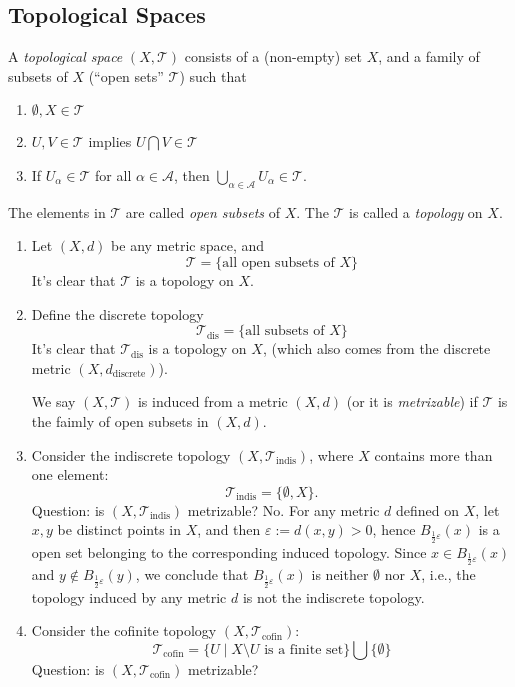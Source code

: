 \subsection{Topological Spaces}
\begin{definition}
A \emph{topological space} $(X,\mathcal{T})$ consists of a (non-empty) set $X$, and a family of subsets of $X$ (``open sets'' $\mathcal{T}$) such that
\begin{enumerate}
\item
$\emptyset,X\in\mathcal{T}$
\item
$U,V\in\mathcal{T}$ implies $U\bigcap V\in \mathcal{T}$
\item
If $U_\alpha\in\mathcal{T}$ for all $\alpha\in\mathcal{A}$, then $\bigcup_{\alpha\in\mathcal{A}}U_\alpha\in\mathcal{T}$.
\end{enumerate}
The elements in $\mathcal{T}$ are called \emph{open subsets} of $X$. The $\mathcal{T}$ is called a \emph{topology} on $X$.
\end{definition}
\begin{example}
\begin{enumerate}
\item
Let $(X,d)$ be any metric space, and
\[
\mathcal{T}=\{\mbox{all open subsets of }X\}
\]
It's clear that $\mathcal{T}$ is a topology on $X$.
\item
Define the discrete topology
\[
\mathcal{T}_{\text{dis}}=\{\mbox{all subsets of }X\}
\]
It's clear that $\mathcal{T}_{\text{dis}}$ is a topology on $X$, (which also comes from the discrete metric $(X,d_{\text{discrete}})$).
\begin{remark}
We say $(X,\mathcal{T})$ is induced from a metric $(X,d)$ (or it is \emph{metrizable}) if $\mathcal{T}$ is the faimly of open subsets in  $(X,d)$.
\end{remark}
\item
Consider the indiscrete topology $(X,\mathcal{T}_{\text{indis}})$, where $X$ contains more than one element:
\[
\mathcal{T}_{\text{indis}}=\{\emptyset,X\}.
\]
Question: is $(X,\mathcal{T}_{\text{indis}})$ metrizable? No. For any metric $d$ defined on $X$, let $x,y$ be distinct points in $X$, and then $\varepsilon:=d(x,y)>0$, hence $B_{\frac{1}{2}\varepsilon}(x)$ is a open set belonging to the corresponding induced topology. Since $x\in B_{\frac{1}{2}\varepsilon}(x)$ and $y\notin B_{\frac{1}{2}\varepsilon}(y)$, we conclude that $B_{\frac{1}{2}\varepsilon}(x)$ is neither $\emptyset$ nor $X$, i.e., the topology induced by any metric $d$ is not the indiscrete topology.
\item
Consider the cofinite topology $(X,\mathcal{T}_{\text{cofin}})$:
\[
\mathcal{T}_{\text{cofin}}=\{U\mid X\setminus U\mbox{ is a finite set}\}\bigcup\{\emptyset\}
\]
Question: is $(X,\mathcal{T}_{\text{cofin}})$ metrizable? 
\end{enumerate}
\end{example}

